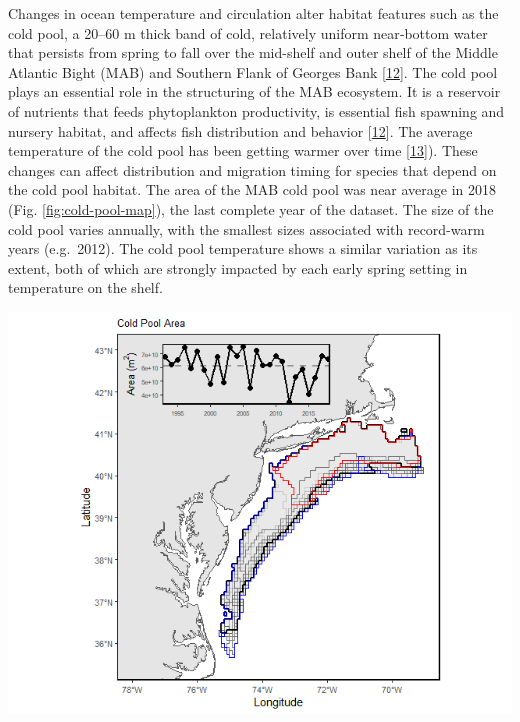 \documentclass[
  10pt,
]{article}
\let\origfigure\figure
\let\endorigfigure\endfigure
\renewenvironment{figure}[1][2] {
    \expandafter\origfigure\expandafter[H]
} {
    \endorigfigure
}
\begin{document}
Changes in ocean temperature and circulation alter habitat features such
as the cold pool, a 20--60 m thick band of cold, relatively uniform
near‐bottom water that persists from spring to fall over the mid-shelf
and outer shelf of the Middle Atlantic Bight (MAB) and Southern Flank of
Georges Bank {[}\protect\hyperlink{ref-lentz_seasonal_2017}{12}{]}. The
cold pool plays an essential role in the structuring of the MAB
ecosystem. It is a reservoir of nutrients that feeds phytoplankton
productivity, is essential fish spawning and nursery habitat, and
affects fish distribution and behavior
{[}\protect\hyperlink{ref-lentz_seasonal_2017}{12}{]}. The average
temperature of the cold pool has been getting warmer over time
{[}\protect\hyperlink{ref-miller_state-space_2016}{13}{]}). These
changes can affect distribution and migration timing for species that
depend on the cold pool habitat. The area of the MAB cold pool was near
average in 2018 (Fig. \ref{fig:cold-pool-map}), the last complete year
of the dataset. The size of the cold pool varies annually, with the
smallest sizes associated with record-warm years (e.g.~2012). The cold
pool temperature shows a similar variation as its extent, both of which
are strongly impacted by each early spring setting in temperature on the
shelf.

\begin{figure}

{\centering \includegraphics[width=8.97in]{images/cold_pool_area} 

}

\caption{Map of cold pool area. Time series of cold pool spatial extent from1993-2018. Black = 2018 (Last year in time series), Red = 2012 Minimum area, Blue = 2005 Maximum area.}\label{fig:cold-pool-map}
\end{figure}
\end{document}

